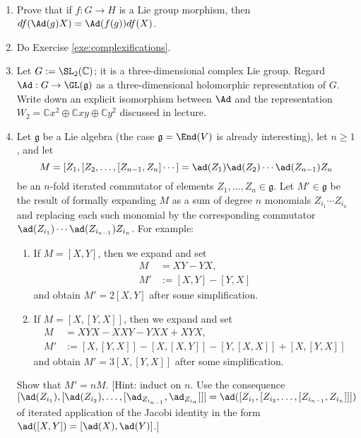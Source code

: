 \documentclass[reqno]{amsart} 
\begin{document}
\begin{homework}~\label{hw:all-about-Ad}
  \begin{enumerate}
  \item Prove that if $f : G \rightarrow H$ is a Lie group morphism, then $d f(\Ad(g) X) = \Ad(f(g)) d f(X)$.
  \item Do Exercise \ref{exe:complexifications}.
  \item Let $G := \SL_2(\mathbb{C})$; it is a three-dimensional complex Lie group.  Regard $\Ad : G \rightarrow \GL(\mathfrak{g})$ as a three-dimensional holomorphic representation of $G$.  Write down an explicit isomorphism between $\Ad$ and the representation $W_2 = \mathbb{C} x^2 \oplus \mathbb{C} x y \oplus \mathbb{C} y^2$ discussed in lecture.
  \item Let $\mathfrak{g}$ be a Lie algebra (the case $\mathfrak{g} = \End(V)$ is already interesting), let $n \geq 1$, and let
    \begin{equation*}
      M = [Z_1,[Z_2,\dotsc,[Z_{n-1},Z_n] \dotsb ] = \ad(Z_1) \ad(Z_2) \dotsb \ad(Z_{n-1}) Z_n
    \end{equation*}
    be an $n$-fold iterated commutator of elements $Z_1,\dotsc,Z_n \in \mathfrak{g}$.  Let $M' \in \mathfrak{g}$ be the result of formally expanding $M$ as a sum of degree $n$ monomials $Z_{i_1} \dotsb Z_{i_n}$ and replacing each such monomial by the corresponding commutator $\ad(Z_{i_1}) \dotsb \ad(Z_{i_{n-1}}) Z_{i_n}$.  For example:
    \begin{enumerate}
    \item If $M = [X,Y]$, then we expand and set
      \begin{align*}
        M &= X Y - Y X,\\
        M' &:= [X,Y] - [Y,X]
      \end{align*}
      and obtain $M' = 2 [X,Y]$ after some simplification.
    \item If $M = [X,[Y,X]]$, then we expand and set
      \begin{align*}
        M &= X Y X - X X Y - Y X X + X Y X, \\
        M' &:= [X,[Y,X]] - [X,[X,Y]] - [Y,[X,X]] + [X,[Y,X]]
      \end{align*}
      and obtain $M ' = 3 [X,[Y,X]]$ after some simplification.
    \end{enumerate}
    Show that $M' = n M$.  [Hint: induct on $n$.  Use the consequence $[\ad(Z_{i_1}), [\ad(Z_{i_2}), \dotsc, [\ad_{Z_{i_{n-1}}}, \ad_{Z_{i_n}}]]] = \ad([Z_{i_1},[Z_{i_2}, \dotsc, [Z_{i_{n-1}}, Z_{i_n}]]])$ of iterated application of the Jacobi identity in the form $\ad([X,Y]) = [\ad(X),\ad(Y)]$.]
  \end{enumerate}
\end{homework}
\end{document}
